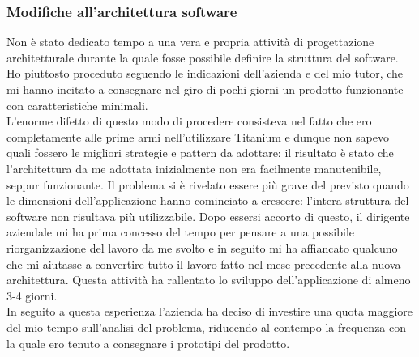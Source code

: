 			\subsubsection{Modifiche all'architettura software}
				Non è stato dedicato tempo a una vera e propria attività di progettazione architetturale durante la quale fosse
				possibile definire la struttura del software. Ho piuttosto proceduto seguendo le indicazioni dell'azienda e del mio
				tutor, che mi hanno incitato a consegnare nel giro di pochi giorni un prodotto funzionante con caratteristiche
				minimali.\\
				L'enorme difetto di questo modo di procedere consisteva nel fatto che ero completamente alle prime armi
				nell'utilizzare Titanium e dunque non sapevo quali fossero le migliori strategie e pattern da adottare: il risultato
				è stato che l'architettura da me adottata inizialmente non era facilmente manutenibile, seppur funzionante. Il
				problema si è rivelato essere più grave del previsto quando le dimensioni dell'applicazione hanno cominciato
				a crescere: l'intera struttura del software non risultava più utilizzabile. Dopo essersi accorto di questo, il
				dirigente aziendale mi ha prima concesso del tempo per pensare a una possibile riorganizzazione del lavoro da me
				svolto e in seguito mi ha affiancato qualcuno che mi aiutasse a convertire tutto il lavoro fatto nel mese precedente
				alla nuova architettura. Questa attività ha rallentato lo sviluppo dell'applicazione di almeno 3-4 giorni.\\
				In seguito a questa esperienza l'azienda ha deciso di investire una quota maggiore del mio tempo sull'analisi del
				problema, riducendo al contempo la frequenza con la quale ero tenuto a consegnare i prototipi del prodotto.
